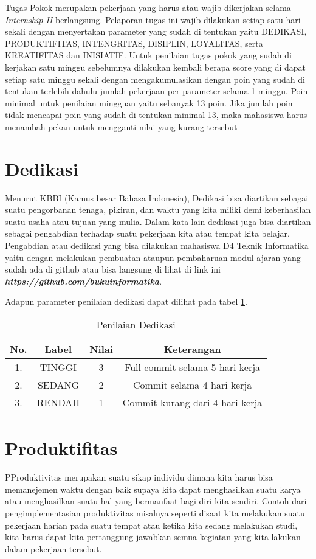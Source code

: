 Tugas Pokok merupakan pekerjaan yang harus atau wajib dikerjakan selama \textit{Internship II} berlangsung. Pelaporan tugas ini wajib dilakukan setiap satu hari sekali dengan menyertakan parameter yang sudah di tentukan yaitu DEDIKASI, PRODUKTIFITAS, INTENGRITAS, DISIPLIN, LOYALITAS, serta KREATIFITAS dan INISIATIF. Untuk penilaian tugas pokok yang sudah di kerjakan satu minggu sebelumnya dilakukan kembali berapa score yang di dapat setiap satu minggu sekali dengan mengakumulasikan dengan poin yang sudah di tentukan terlebih dahulu jumlah pekerjaan per-parameter selama 1 minggu. Poin minimal untuk penilaian mingguan yaitu sebanyak 13 poin. Jika jumlah poin tidak mencapai poin yang sudah di tentukan minimal 13, maka mahasiswa harus menambah pekan untuk mengganti nilai yang kurang tersebut

\section{Dedikasi}

Menurut KBBI (Kamus besar Bahasa Indonesia), Dedikasi bisa diartikan sebagai suatu pengorbanan tenaga, pikiran, dan waktu yang kita miliki demi keberhasilan suatu usaha atau tujuan yang mulia. Dalam kata lain dedikasi juga bisa diartikan sebagai pengabdian terhadap suatu pekerjaan kita atau tempat kita belajar. Pengabdian atau dedikasi yang bisa dilakukan mahasiswa D4 Teknik Informatika yaitu dengan melakukan pembuatan ataupun pembaharuan modul ajaran yang sudah ada di github atau bisa langsung di lihat di link ini \textbf{\textit{https://github.com/bukuinformatika}}.

Adapun parameter penilaian dedikasi dapat dilihat pada tabel \ref{tab:nilaidedikasi}.

\begin{table}[H]
\caption{Penilaian Dedikasi}
\centering
\begin{tabular}{|c|c|c|c|}
\hline
\textbf{No.}&\textbf{Label}&\textbf{Nilai}&\textbf{Keterangan}\\
\hline
1.&TINGGI&3&Full commit selama 5 hari kerja\\
\hline
2.&SEDANG&2&Commit selama 4 hari kerja\\
\hline
3.&RENDAH&1&Commit kurang dari 4 hari kerja\\
\hline
\end{tabular}
\label{tab:nilaidedikasi}
\end{table}

\section{Produktifitas}
PProduktivitas merupakan suatu sikap individu dimana kita harus bisa memanejemen waktu dengan baik supaya kita dapat menghasilkan suatu karya atau menghasilkan suatu hal yang bermanfaat bagi diri kita sendiri. Contoh dari pengimplementasian produktivitas misalnya seperti disaat kita melakukan suatu pekerjaan harian pada suatu tempat atau ketika kita sedang melakukan studi, kita harus dapat kita pertanggung jawabkan semua kegiatan yang kita lakukan dalam pekerjaan tersebut.

